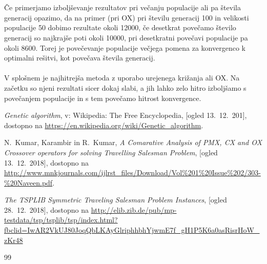 \documentclass[12pt,a4paper]{amsart}
\theoremstyle{definition} %
\theoremstyle{plain} %
\begin{document}
\\
\\
Če primerjamo izboljševanje rezultatov pri večanju populacije ali pa števila generacij opazimo, da na primer (pri OX) pri številu generacij 100 in velikosti populacije 50 dobimo rezultate okoli 12000, če desetkrat povečamo število generacij so najkrajše poti okoli 10000, pri desetkratni povečavi populacije pa okoli 8600. Torej je povečevanje populacije večjega pomena za konvergenco k optimalni rešitvi, kot povečava števila generacij.
\\
\\
 V splošnem je najhitrejša metoda z uporabo urejenega križanja ali OX. Na začetku so njeni rezultati sicer dokaj slabi, a jih lahko zelo hitro izboljšamo s povečanjem populacije in s tem povečamo hitrost konvergence. 

\newpage
\begin{thebibliography}{99}


\emph{Genetic algorithm}, v: Wikipedia: The Free Encyclopedia, [ogled 13.~12.~201], dostopno na \url{https://en.wikipedia.org/wiki/Genetic_algorithm}.

N.~Kumar, Karambir in R.~Kumar, \emph{A Comarative Analysis of PMX, CX and OX Crossover operators for solving Travelling Salesman Problem}, [ogled 13.~12.~2018], dostopno na \url{http://www.mnkjournals.com/ijlrst_files/Download/Vol%201%20Issue%202/303-%20Naveen.pdf}.


 \emph{ The TSPLIB Symmetric Traveling Salesman Problem Instances}, [ogled 28.~12.~2018], dostopno na \url{http://elib.zib.de/pub/mp-testdata/tsp/tsplib/tsp/index.html?fbclid=IwAR2VkUJ80JoqQbLKAyGlriphhbhYjwmE7f_gH1P5K6a0asRisrHoW_zKr48}




\end{thebibliography}{99}
\end{document}
